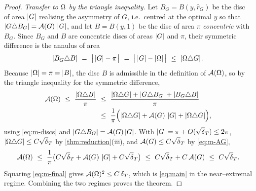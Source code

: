 \begin{proof}
\emph{Transfer to $\Omega$ by the triangle inequality.} Let $B_G=B(y,\hat r_G)$
be the disc of area $\left\lvert G\right\rvert$ realising the asymmetry of $G$, i.e.\ centred at
the optimal $y$ so that $\left\lvert G\triangle B_G\right\rvert=\mathcal{A}(G)\,\left\lvert G\right\rvert$, and let
$B=B(y,1)$ be the disc of area $\pi$ \emph{concentric} with $B_G$. Since
$B_G$ and $B$ are concentric discs of areas $\left\lvert G\right\rvert$ and $\pi$, their
symmetric difference is the annulus of area
\begin{equation}\label{eq:m-discs}
   \left\lvert B_G\triangle B\right\rvert\ =\ \bigl|\,\left\lvert G\right\rvert-\pi\,\bigr|
   \ =\ \bigl|\,\left\lvert G\right\rvert-\left\lvert\Omega\right\rvert\,\bigr|\ \le\ \left\lvert\Omega\triangle G\right\rvert.
\end{equation}
Because $\left\lvert\Omega\right\rvert=\pi=\left\lvert B\right\rvert$, the disc $B$ is admissible in the definition of
$\mathcal{A}(\Omega)$, so by the triangle inequality for the symmetric difference,
\begin{align*}
   \mathcal{A}(\Omega)\ \le\ \frac{\left\lvert\Omega\triangle B\right\rvert}{\pi}
   &\ \le\ \frac{\left\lvert\Omega\triangle G\right\rvert+\left\lvert G\triangle B_G\right\rvert
            +\left\lvert B_G\triangle B\right\rvert}{\pi}\\
   &\ \le\ \frac1\pi\Bigl(\left\lvert\Omega\triangle G\right\rvert+\mathcal{A}(G)\,\left\lvert G\right\rvert
            +\left\lvert\Omega\triangle G\right\rvert\Bigr),
\end{align*}
using \eqref{eq:m-discs} and $\left\lvert G\triangle B_G\right\rvert=\mathcal{A}(G)\left\lvert G\right\rvert$. With
$\abs G=\pi+O(\sqrt\dT)\le2\pi$, $\abs{\Om\triangle G}\le C\sqrt\dT$ by
\cref{thm:reduction}(iii), and $\AF(G)\le C\sqrt\dT$ by \eqref{eq:m-AG},
\begin{equation}\label{eq:m-final}
   \AF(\Om)\ \le\ \frac1\pi\bigl(C\sqrt\dT+\AF(G)\,\abs G+C\sqrt\dT\bigr)
   \ \le\ C\sqrt\dT+C\,\AF(G)\ \le\ C\sqrt\dT.
\end{equation}
Squaring \eqref{eq:m-final} gives $\mathcal{A}(\Omega)^2\le C\,\delta_T$, which is
\eqref{eq:main} in the near--extremal regime. Combining the two regimes
proves the theorem.
\end{proof}

